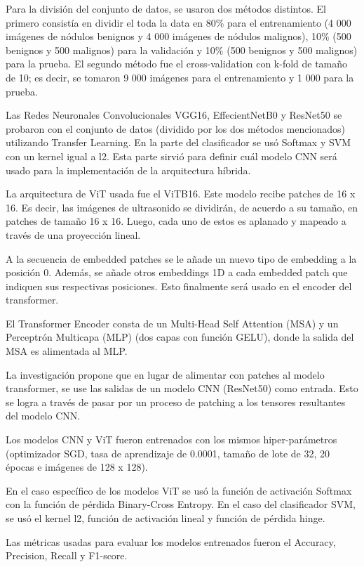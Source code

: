 Para la división del conjunto de datos, se usaron dos métodos distintos. El primero consistía en dividir el toda la data en 80\% para el entrenamiento (4 000 imágenes de nódulos benignos y 4 000 imágenes de nódulos malignos), 10\% (500 benignos y 500 malignos) para la validación y 10\% (500 benignos y 500 malignos) para la prueba. El segundo método fue el cross-validation con k-fold de tamaño de 10; es decir, se tomaron 9 000 imágenes para el entrenamiento y 1 000 para la prueba.

Las Redes Neuronales Convolucionales VGG16, EffecientNetB0 y ResNet50 se probaron con el conjunto de datos (dividido por los dos métodos mencionados) utilizando Transfer Learning. En la parte del clasificador se usó Softmax y SVM con un kernel igual a l2. Esta parte sirvió para definir cuál modelo CNN será usado para la implementación de la arquitectura híbrida.

La arquitectura de ViT usada fue el ViTB16. Este modelo recibe patches de 16 x 16. Es decir, las imágenes de ultrasonido se dividirán, de acuerdo a su tamaño, en patches de tamaño 16 x 16. Luego, cada uno de estos es aplanado y mapeado a través de una proyección lineal.

A la secuencia de embedded patches se le añade un nuevo tipo de embedding a la posición 0. Además, se añade otros embeddings 1D a cada embedded patch que indiquen sus respectivas posiciones. Esto finalmente será usado en el encoder del transformer.

El Transformer Encoder consta de un Multi-Head Self Attention (MSA) y un Perceptrón Multicapa (MLP) (dos capas con función GELU), donde la salida del MSA es alimentada al MLP.

La investigación propone que en lugar de alimentar con patches al modelo transformer, se use las salidas de un modelo CNN (ResNet50) como entrada. Esto se logra a través de pasar por un proceso de patching a los tensores resultantes del modelo CNN.

Los modelos CNN y ViT fueron entrenados con los mismos hiper-parámetros (optimizador SGD, tasa de aprendizaje de 0.0001, tamaño de lote de 32, 20 épocas e imágenes de 128 x 128).

En el caso específico de los modelos ViT se usó la función de activación Softmax con la función de pérdida Binary-Cross Entropy. En el caso del clasificador SVM, se usó el kernel l2, función de activación lineal y función de pérdida hinge.

Las métricas usadas para evaluar los modelos entrenados fueron el Accuracy, Precision, Recall y F1-score.

